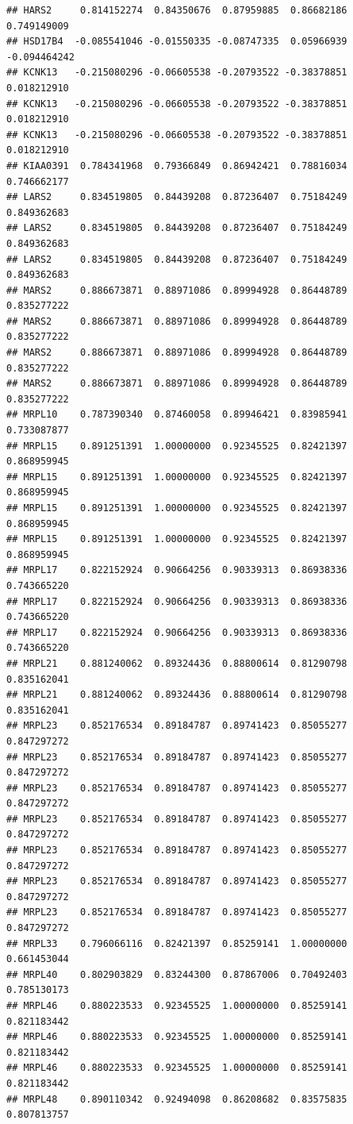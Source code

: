\documentclass[
]{article}
\begin{document}
\begin{verbatim}
## HARS2     0.814152274  0.84350676  0.87959885  0.86682186  0.749149009
## HSD17B4  -0.085541046 -0.01550335 -0.08747335  0.05966939 -0.094464242
## KCNK13   -0.215080296 -0.06605538 -0.20793522 -0.38378851  0.018212910
## KCNK13   -0.215080296 -0.06605538 -0.20793522 -0.38378851  0.018212910
## KCNK13   -0.215080296 -0.06605538 -0.20793522 -0.38378851  0.018212910
## KIAA0391  0.784341968  0.79366849  0.86942421  0.78816034  0.746662177
## LARS2     0.834519805  0.84439208  0.87236407  0.75184249  0.849362683
## LARS2     0.834519805  0.84439208  0.87236407  0.75184249  0.849362683
## LARS2     0.834519805  0.84439208  0.87236407  0.75184249  0.849362683
## MARS2     0.886673871  0.88971086  0.89994928  0.86448789  0.835277222
## MARS2     0.886673871  0.88971086  0.89994928  0.86448789  0.835277222
## MARS2     0.886673871  0.88971086  0.89994928  0.86448789  0.835277222
## MARS2     0.886673871  0.88971086  0.89994928  0.86448789  0.835277222
## MRPL10    0.787390340  0.87460058  0.89946421  0.83985941  0.733087877
## MRPL15    0.891251391  1.00000000  0.92345525  0.82421397  0.868959945
## MRPL15    0.891251391  1.00000000  0.92345525  0.82421397  0.868959945
## MRPL15    0.891251391  1.00000000  0.92345525  0.82421397  0.868959945
## MRPL15    0.891251391  1.00000000  0.92345525  0.82421397  0.868959945
## MRPL17    0.822152924  0.90664256  0.90339313  0.86938336  0.743665220
## MRPL17    0.822152924  0.90664256  0.90339313  0.86938336  0.743665220
## MRPL17    0.822152924  0.90664256  0.90339313  0.86938336  0.743665220
## MRPL21    0.881240062  0.89324436  0.88800614  0.81290798  0.835162041
## MRPL21    0.881240062  0.89324436  0.88800614  0.81290798  0.835162041
## MRPL23    0.852176534  0.89184787  0.89741423  0.85055277  0.847297272
## MRPL23    0.852176534  0.89184787  0.89741423  0.85055277  0.847297272
## MRPL23    0.852176534  0.89184787  0.89741423  0.85055277  0.847297272
## MRPL23    0.852176534  0.89184787  0.89741423  0.85055277  0.847297272
## MRPL23    0.852176534  0.89184787  0.89741423  0.85055277  0.847297272
## MRPL23    0.852176534  0.89184787  0.89741423  0.85055277  0.847297272
## MRPL23    0.852176534  0.89184787  0.89741423  0.85055277  0.847297272
## MRPL33    0.796066116  0.82421397  0.85259141  1.00000000  0.661453044
## MRPL40    0.802903829  0.83244300  0.87867006  0.70492403  0.785130173
## MRPL46    0.880223533  0.92345525  1.00000000  0.85259141  0.821183442
## MRPL46    0.880223533  0.92345525  1.00000000  0.85259141  0.821183442
## MRPL46    0.880223533  0.92345525  1.00000000  0.85259141  0.821183442
## MRPL48    0.890110342  0.92494098  0.86208682  0.83575835  0.807813757

\end{verbatim}
\end{document}
